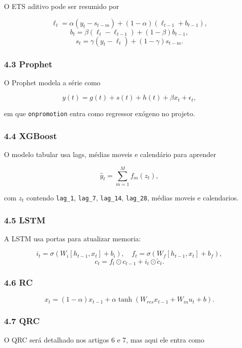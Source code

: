 \documentclass[12pt]{article}
\begin{document}
O ETS aditivo pode ser resumido por

\[
\ell_t = \alpha (y_t - s_{t-m}) + (1 - \alpha)(\ell_{t-1} + b_{t-1}),
\]
\[
b_t = \beta (\ell_t - \ell_{t-1}) + (1 - \beta) b_{t-1},
\]
\[
s_t = \gamma (y_t - \ell_t) + (1 - \gamma) s_{t-m}.
\]

\subsubsection{4.3 Prophet}\label{43-prophet}

O Prophet modela a série como

\[
y(t) = g(t) + s(t) + h(t) + \beta x_t + \epsilon_t,
\]

em que \texttt{onpromotion} entra como regressor exógeno no projeto.

\subsubsection{4.4 XGBoost}\label{44-xgboost}

O modelo tabular usa lags, médias moveis e calendário para aprender

\[
\hat{y}_t = \sum_{m=1}^M f_m(z_t),
\]

com \(z_t\) contendo \texttt{lag\_1}, \texttt{lag\_7}, \texttt{lag\_14}, \texttt{lag\_28}, médias moveis e calendarios.

\subsubsection{4.5 LSTM}\label{45-lstm}

A LSTM usa portas para atualizar memoria:

\[
i_t = \sigma(W_i [h_{t-1}, x_t] + b_i), \quad
f_t = \sigma(W_f [h_{t-1}, x_t] + b_f),
\]
\[
c_t = f_t \odot c_{t-1} + i_t \odot \tilde{c}_t.
\]

\subsubsection{4.6 RC}\label{46-rc}

\[
x_t = (1 - \alpha) x_{t-1} + \alpha \tanh(W_{res} x_{t-1} + W_{in} u_t + b).
\]

\subsubsection{4.7 QRC}\label{47-qrc}

O QRC será detalhado nos artigos 6 e 7, mas aqui ele entra como
\end{document}
